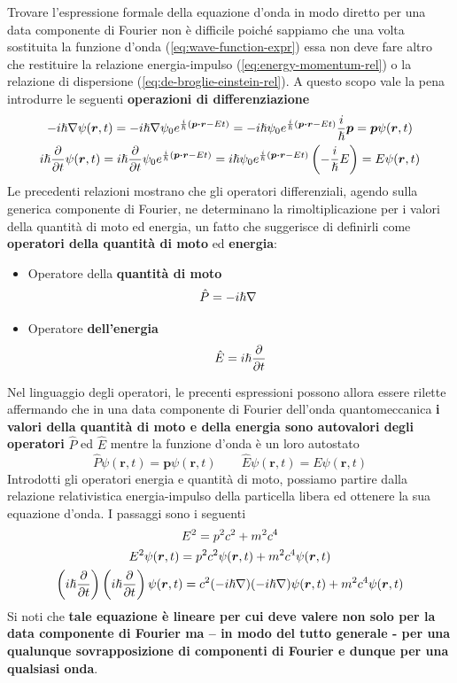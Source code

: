 Trovare l'espressione formale della equazione d'onda in modo diretto per
una data componente di Fourier non è difficile poiché sappiamo che una
volta sostituita la funzione d'onda (\ref{eq:wave-function-expr}) essa non deve fare altro
che restituire la relazione energia-impulso (\ref{eq:energy-momentum-rel}) o la relazione di
dispersione (\ref{eq:de-broglie-einstein-rel}).
A questo scopo vale la pena introdurre le seguenti \textbf{operazioni di differenziazione}
\begin{gather}
	- i \hp \nabla \psi (\bm{r},t) = - i \hp \nabla \psi_{0} e ^{\frac{i}{\hp}(\bm{p \cdot r}-E t)} =
	- i \hp \psi_{0} e^{\frac{i}{\hp}(\bm{p \cdot r}-E t)} \frac{i}{\hp} \bm{p} = \bm{p}\psi(\bm{r},t) \nonumber\\
	i \hp \frac{\partial}{\partial t} \psi (\bm{r},t) =
	i \hp \frac{\partial}{\partial t} \psi_{0} e^{\frac{i}{\hp}(\bm{p \cdot r}-E t)} =
	i \hp \psi_{0} e^{\frac{i}{\hp}(\bm{p \cdot r}-E t)} \left( - \frac{i}{\hp} E\right) = E\psi(\bm{r},t)
	\label{eq:differential-operators-qm}
\end{gather}
Le precedenti relazioni mostrano che gli operatori differenziali, agendo
sulla generica componente di Fourier, ne determinano la
rimoltiplicazione per i valori della quantità di moto ed energia, un
fatto che suggerisce di definirli come \textbf{operatori della quantità
di moto} ed \textbf{energia}:
\begin{itemize}
	\item Operatore della \textbf{quantità di moto}
	\[
	   \hat{P} = - i \hslash \nabla    \qquad
	\]
	\item Operatore \textbf{dell'energia}
	\[
		\hat{E} = i \hslash \frac{\partial}{\partial t}
	\]
\end{itemize}
Nel linguaggio degli operatori, le precenti espressioni possono allora
essere rilette affermando che in una data componente di Fourier
dell'onda quantomeccanica \textbf{i valori della quantità di moto e
della energia sono autovalori degli operatori} \(\hat{P}\) ed
\(\hat{E}\) mentre la funzione d'onda è un loro autostato
\[
	\hat{P}\psi(\bm{r},t) = \bm{p}\psi(\bm{r},t) \qquad
	\hat{E}\psi(\bm{r},t) = E\psi(\bm{r},t)
\]
Introdotti gli operatori energia e quantità di moto, possiamo
partire dalla relazione relativistica energia-impulso della particella
libera ed ottenere la sua equazione d'onda.
I passaggi sono i seguenti
\begin{gather*}
	E^2 = p^2c^2 + m^2c^4\\
	E^2\psi(\bm{r},t) = p^2c^2\psi(\bm{r},t)+m^2c^4\psi(\bm{r},t)\\
	\left( i \hslash \frac{\partial}{\partial t}\right)\left( i \hslash \frac{\partial}{\partial t}\right)\psi(\bm{r},t) = c^2 (-i \hslash \nabla)(-i \hslash \nabla)\psi(\bm{r},t)+m^2c^4 \psi(\bm{r},t)
\end{gather*}
Si noti che \textbf{tale equazione è lineare per cui deve valere non
solo per la data componente di Fourier ma -- in modo del tutto generale
- per una qualunque sovrapposizione di componenti di Fourier e dunque
per una qualsiasi onda}.

